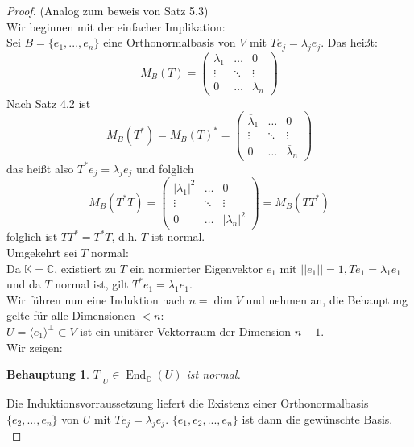 \documentclass[12pt,a4paper]{article}
\newtheorem{claim}{Behauptung}
\theoremstyle{definition}
\theoremstyle{remark}
\renewcommand{\bar}[1]{\overline{#1}}
\DeclareMathOperator{\End}{End}
\begin{document}
	\begin{proof}
		(Analog zum beweis von Satz 5.3) \\
		Wir beginnen mit der einfacher Implikation: \\
		Sei $B = \{ e_1,...,e_n \}$ eine Orthonormalbasis von $V$ mit $Te_j = \lambda_j e_j$. Das heißt: \\
		\begin{equation}
			M_B(T) = 
			\begin{pmatrix}
				\lambda_1 & \dots & 0 \\
				\vdots & \ddots & \vdots \\
				0 & \dots & \lambda_n
			\end{pmatrix}
		\end{equation}
		Nach Satz 4.2 ist 
		\begin{equation}
			M_B(T^*) = M_B(T)^* = 
			\begin{pmatrix}
				\bar{\lambda}_1 & \dots & 0 \\
				\vdots & \ddots & \vdots \\
				0 & \dots & \bar{\lambda}_n
			\end{pmatrix}
		\end{equation}
		das heißt also $T^*e_j = \bar{\lambda}_j e_j$ und folglich
		\begin{equation}
			M_B(T^*T) = 
			\begin{pmatrix}
				|\lambda_1|^2 & \dots & 0 \\
				\vdots & \ddots & \vdots \\
				0 & \dots & |\lambda_n|^2
			\end{pmatrix}
			= M_B(TT^*)
		\end{equation}
		folglich ist $TT^* = T^* T$, d.h. $T$ ist normal. \\
		Umgekehrt sei $T$ normal: \\
		 Da $\mathbb{K} = \mathbb{C}$, existiert zu $T$ ein normierter Eigenvektor $e_1$ mit $||e_1 ||=1, Te_1 = \lambda_1 e_1$ und da $T$ normal ist, gilt $T^* e_1 = \bar{\lambda}_1 e_1 $. \\
		 Wir führen nun eine Induktion nach $n = \dim V$ und nehmen an, die Behauptung gelte für alle Dimensionen $<n$: \\
		 $U = \langle e_1 \rangle^{\perp} \subset V$ ist ein unitärer Vektorraum der Dimension $n-1$. \\
		 Wir zeigen:
		 \begin{claim}
		 	$T|_U \in \End_{\mathbb{C}}(U)$ ist normal.
		 \end{claim}
		 Die Induktionsvorraussetzung liefert die Existenz einer Orthonormalbasis $\{ e_2,...,e_n \}$ von $U$ mit $Te_j = \lambda_j e_j$. $\{ e_1,e_2,...,e_n \}$ ist dann die gewünschte Basis. \\

\end{proof}
\end{document}

